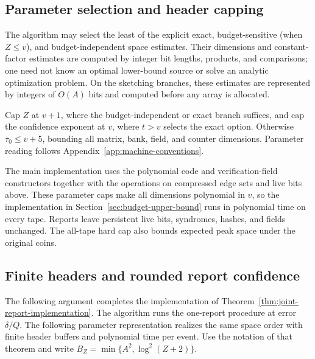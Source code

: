 \documentclass[11pt,letterpaper]{article}
\numberwithin{equation}{section}
\begin{document}
\subsection{Parameter selection and header capping}
\label{app:budget-finite-work}
The algorithm may select the least of the explicit exact, budget-sensitive (when $Z\le v$), and budget-independent space estimates.
Their dimensions and constant-factor estimates are computed by integer bit lengths, products, and comparisons; one need not know an optimal lower-bound source or solve an analytic optimization problem.
On the sketching branches, these estimates are represented by integers of $O(A)$ bits and computed before any array is allocated.

Cap $Z$ at $v+1$, where the budget-independent or exact branch suffices, and cap the confidence exponent at $v$, where $t>v$ selects the exact option.
Otherwise $\tau_0\le v+5$, bounding all matrix, bank, field, and counter dimensions.
Parameter reading follows Appendix~\ref{app:machine-conventions}.

The main implementation uses the polynomial code and verification-field constructors together with the operations on compressed edge sets and live bits above.
These parameter caps make all dimensions polynomial in $v$, so the implementation in Section~\ref{sec:budget-upper-bound} runs in polynomial time on every tape.
Reports leave persistent live bits, syndromes, hashes, and fields unchanged.
The all-tape hard cap also bounds expected peak space under the original coins.



\subsection{Finite headers and rounded report confidence}
\label{app:joint-header-implementation}

The following argument completes the implementation of Theorem~\ref{thm:joint-report-implementation}.
The algorithm runs the one-report procedure at error $\delta/Q$.
The following parameter representation realizes the same space order with finite header buffers and polynomial time per event.
Use the notation of that theorem and write $B_Z=\min\{A^2,\log^2(Z+2)\}$.
\end{document}
